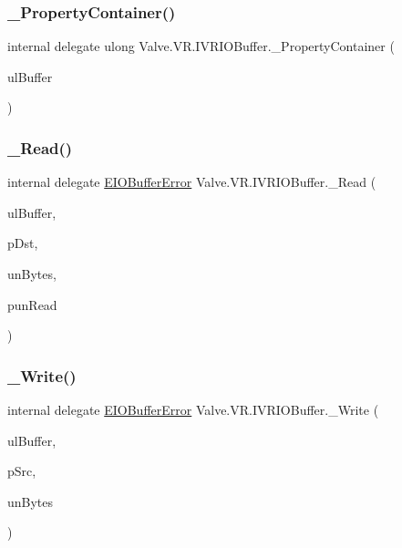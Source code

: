 \mbox{\label{struct_valve_1_1_v_r_1_1_i_v_r_i_o_buffer_abbf839546716805d584e6cba3040013a}} 
\subsubsection{\texorpdfstring{\_PropertyContainer()}{\_PropertyContainer()}}
{\footnotesize\ttfamily internal delegate ulong Valve.\+V\+R.\+I\+V\+R\+I\+O\+Buffer.\+\_\+\+Property\+Container (\begin{DoxyParamCaption}\item[{ulong}]{ul\+Buffer }\end{DoxyParamCaption})}

\mbox{\label{struct_valve_1_1_v_r_1_1_i_v_r_i_o_buffer_ae347b94fa06c9a91e3f7bb3baa432c6a}} 
\subsubsection{\texorpdfstring{\_Read()}{\_Read()}}
{\footnotesize\ttfamily internal delegate \mbox{\hyperlink{namespace_valve_1_1_v_r_a11d6c73dbb80923b10779c007bb8c154}{E\+I\+O\+Buffer\+Error}} Valve.\+V\+R.\+I\+V\+R\+I\+O\+Buffer.\+\_\+\+Read (\begin{DoxyParamCaption}\item[{ulong}]{ul\+Buffer,  }\item[{Int\+Ptr}]{p\+Dst,  }\item[{uint}]{un\+Bytes,  }\item[{ref uint}]{pun\+Read }\end{DoxyParamCaption})}

\mbox{\label{struct_valve_1_1_v_r_1_1_i_v_r_i_o_buffer_a54b193825077c30de700adf41e81b975}} 
\subsubsection{\texorpdfstring{\_Write()}{\_Write()}}
{\footnotesize\ttfamily internal delegate \mbox{\hyperlink{namespace_valve_1_1_v_r_a11d6c73dbb80923b10779c007bb8c154}{E\+I\+O\+Buffer\+Error}} Valve.\+V\+R.\+I\+V\+R\+I\+O\+Buffer.\+\_\+\+Write (\begin{DoxyParamCaption}\item[{ulong}]{ul\+Buffer,  }\item[{Int\+Ptr}]{p\+Src,  }\item[{uint}]{un\+Bytes }\end{DoxyParamCaption})}



